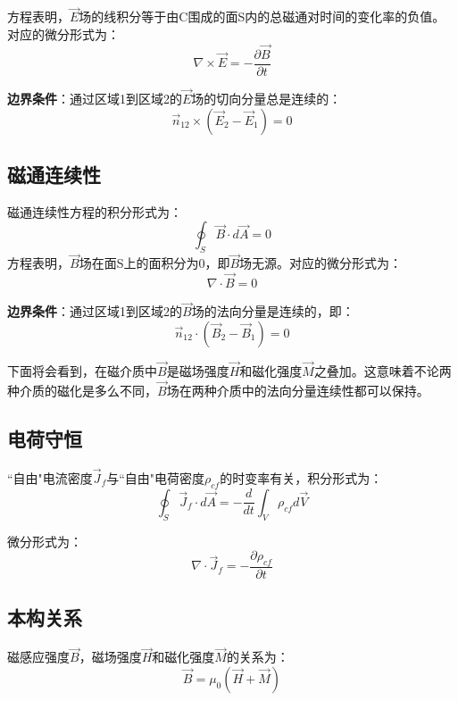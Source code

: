 方程表明，$\vec{E}$场的线积分等于由C围成的面S内的总磁通对时间的变化率的负值。对应的微分形式为：
\begin{equation}
   \nabla \times \vec{E}=-\frac{\partial{\vec{B}}}{\partial{t}}
\end{equation}

\textbf{边界条件}：通过区域1到区域2的$\vec{E}$场的切向分量总是连续的：
\begin{equation}\label{eqn:faraday bc}
  \vec{n}_{12}\times (\vec{E}_2-\vec{E}_1)=0
\end{equation}

\subsection{磁通连续性}
磁通连续性方程的积分形式为：
\begin{equation}
\oint_S \vec{B}\cdot d\vec{A}=0
\end{equation}
方程表明，$\vec{B}$场在面S上的面积分为0，即$\vec{B}$场无源。对应的微分形式为：
\begin{equation}
  \nabla \cdot \vec{B}=0
\end{equation}

\textbf{边界条件}：通过区域1到区域2的$\vec{B}$场的法向分量是连续的，即：
\begin{equation}
  \vec{n}_{12}\cdot (\vec{B}_2-\vec{B}_1)=0
\end{equation}

下面将会看到，在磁介质中$\vec{B}$是磁场强度$\vec{H}$和磁化强度$\vec{M}$之叠加。这意味着不论两种介质的磁化是多么不同，$\vec{B}$场在两种介质中的法向分量连续性都可以保持。

\subsection{电荷守恒}
``自由"电流密度$\vec{J}_f$与``自由"电荷密度$\rho_{cf}$的时变率有关，积分形式为：
\begin{equation}
\oint_S \vec{J}_f\cdot d\vec{A}=-\frac{d}{dt}\int_V \rho_{cf}d\vec{V}
\end{equation}

微分形式为：
\begin{equation}
   \nabla \cdot \vec{J}_f=-\frac{\partial{\rho_{cf}}}{\partial{t}}
\end{equation}

\subsection{本构关系}
磁感应强度$\vec{B}$，磁场强度$\vec{H}$和磁化强度$\vec{M}$的关系为：
\begin{equation}
\vec{B}=\mu_0(\vec{H}+\vec{M})
\end{equation}

